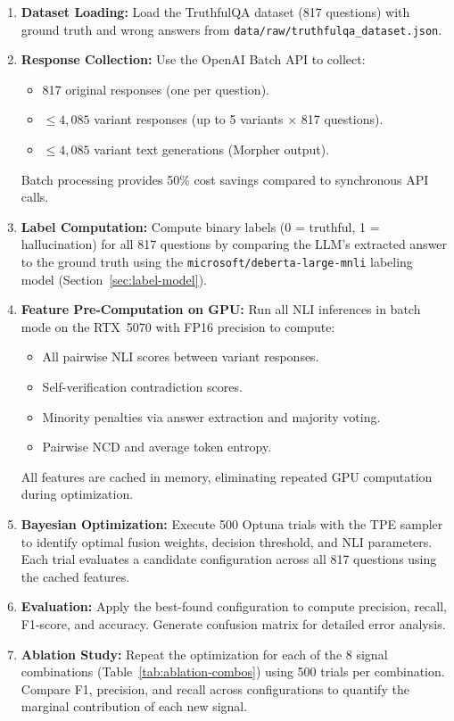 \begin{enumerate}
    \item \textbf{Dataset Loading:} Load the TruthfulQA dataset (817 questions) with ground truth and wrong answers from \texttt{data/raw/truthfulqa\_dataset.json}.

    \item \textbf{Response Collection:} Use the OpenAI Batch API to collect:
    \begin{itemize}
        \item 817 original responses (one per question).
        \item $\leq 4{,}085$ variant responses (up to 5 variants $\times$ 817 questions).
        \item $\leq 4{,}085$ variant text generations (Morpher output).
    \end{itemize}
    Batch processing provides 50\% cost savings compared to synchronous API calls.

    \item \textbf{Label Computation:} Compute binary labels (0 = truthful, 1 = hallucination) for all 817 questions by comparing the LLM's extracted answer to the ground truth using the \texttt{microsoft/deberta-large-mnli} labeling model (Section~\ref{sec:label-model}).

    \item \textbf{Feature Pre-Computation on GPU:} Run all NLI inferences in batch mode on the RTX~5070 with FP16 precision to compute:
    \begin{itemize}
        \item All pairwise NLI scores between variant responses.
        \item Self-verification contradiction scores.
        \item Minority penalties via answer extraction and majority voting.
        \item Pairwise NCD and average token entropy.
    \end{itemize}
    All features are cached in memory, eliminating repeated GPU computation during optimization.

    \item \textbf{Bayesian Optimization:} Execute 500 Optuna trials with the TPE sampler to identify optimal fusion weights, decision threshold, and NLI parameters. Each trial evaluates a candidate configuration across all 817 questions using the cached features.

    \item \textbf{Evaluation:} Apply the best-found configuration to compute precision, recall, F1-score, and accuracy. Generate confusion matrix for detailed error analysis.

    \item \textbf{Ablation Study:} Repeat the optimization for each of the 8 signal combinations (Table~\ref{tab:ablation-combos}) using 500 trials per combination. Compare F1, precision, and recall across configurations to quantify the marginal contribution of each new signal.
\end{enumerate}

